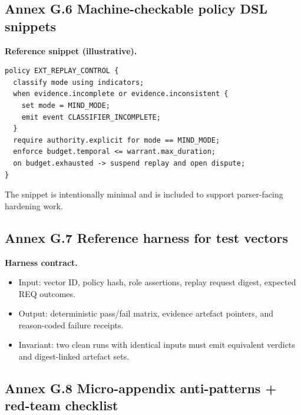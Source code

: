 \documentclass[11pt]{article}
\theoremstyle{definition}
\theoremstyle{plain}
\theoremstyle{remark}
\begin{document}
\subsection{Annex G.6 Machine-checkable policy DSL snippets}
\label{ann:ext-dsl}

\textbf{Reference snippet (illustrative).}
\begin{verbatim}
policy EXT_REPLAY_CONTROL {
  classify mode using indicators;
  when evidence.incomplete or evidence.inconsistent {
    set mode = MIND_MODE;
    emit event CLASSIFIER_INCOMPLETE;
  }
  require authority.explicit for mode == MIND_MODE;
  enforce budget.temporal <= warrant.max_duration;
  on budget.exhausted -> suspend replay and open dispute;
}
\end{verbatim}

The snippet is intentionally minimal and is included to support parser-facing hardening work.

\subsection{Annex G.7 Reference harness for test vectors}
\label{ann:ext-harness}

\textbf{Harness contract.}
\begin{itemize}[leftmargin=*]
  \item Input: vector ID, policy hash, role assertions, replay request digest, expected REQ outcomes.
  \item Output: deterministic pass/fail matrix, evidence artefact pointers, and reason-coded failure receipts.
  \item Invariant: two clean runs with identical inputs must emit equivalent verdicts and digest-linked artefact sets.
\end{itemize}

\subsection{Annex G.8 Micro-appendix anti-patterns + red-team checklist}
\label{ann:ext-antipatterns}
\end{document}
